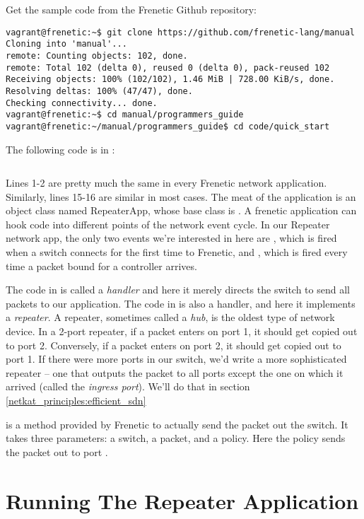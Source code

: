 Get the sample code from the Frenetic Github repository:

\begin{verbatim}
vagrant@frenetic:~$ git clone https://github.com/frenetic-lang/manual
Cloning into 'manual'...
remote: Counting objects: 102, done.
remote: Total 102 (delta 0), reused 0 (delta 0), pack-reused 102
Receiving objects: 100% (102/102), 1.46 MiB | 728.00 KiB/s, done.
Resolving deltas: 100% (47/47), done.
Checking connectivity... done.
vagrant@frenetic:~$ cd manual/programmers_guide
vagrant@frenetic:~/manual/programmers_guide$ cd code/quick_start
\end{verbatim}

The following code is in :

\inputminted[linenos]{python}{code/quick_start/repeater.py}

Lines 1-2 are pretty much the same in every Frenetic network application.
Similarly, lines 15-16 are similar in most cases. 
 The meat of the application is an object class named RepeaterApp, whose base class is .
A frenetic application can hook code into different points of the network event cycle.
In our Repeater network app, the only two events we're interested in here are
, which is fired when a switch connects for the first time to Frenetic, and 
 , which is fired every time a packet
bound for a controller arrives.

The code in  is called a \emph{handler} and here it 
merely directs the switch to send all packets to our application.
The code in  is also a handler, and here it implements a {\it repeater}.
A repeater, sometimes called a {\it hub}, is the oldest type of network device. 
In a 2-port repeater, if a packet enters on port 1, it should get copied out to port 2.  
Conversely, if a packet enters on port 2, it should get copied out to port 1.
If there were more ports in our switch, we'd write a more sophisticated repeater -- one that
outputs the packet to all ports except the one on which it arrived (called the {\it ingress port}). 
We'll do that in section \ref{netkat_principles:efficient_sdn} 

 is a method provided by Frenetic to actually send the packet out the switch.  It takes three 
parameters: a switch, a packet, and a policy.  
Here the policy sends the packet out to port .   

\section{Running The Repeater Application}

